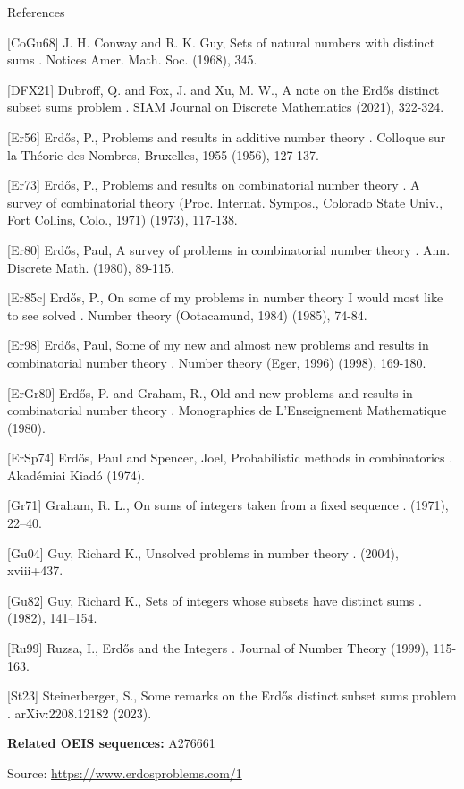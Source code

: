 \documentclass{article}
\begin{document}
References

[CoGu68] J. H. Conway and R. K. Guy, Sets of natural numbers with distinct sums . Notices Amer. Math. Soc. (1968), 345.

[DFX21] Dubroff, Q. and Fox, J. and Xu, M. W., A note on the Erd\H{o}s distinct subset sums problem . SIAM Journal on Discrete Mathematics (2021), 322-324.

[Er56] Erd\H{o}s, P., Problems and results in additive number theory . Colloque sur la Th\'{e}orie des Nombres, Bruxelles, 1955 (1956), 127-137.

[Er73] Erd\H{o}s, P., Problems and results on combinatorial number theory . A survey of combinatorial theory (Proc. Internat. Sympos., Colorado State Univ., Fort Collins, Colo., 1971) (1973), 117-138.

[Er80] Erd\H{o}s, Paul, A survey of problems in combinatorial number theory . Ann. Discrete Math. (1980), 89-115.

[Er85c] Erd\H{o}s, P., On some of my problems in number theory I would most like to see solved . Number theory (Ootacamund, 1984) (1985), 74-84.

[Er98] Erd\H{o}s, Paul, Some of my new and almost new problems and results in combinatorial number theory . Number theory (Eger, 1996) (1998), 169-180.

[ErGr80] Erd\H{o}s, P. and Graham, R., Old and new problems and results in combinatorial number theory . Monographies de L'Enseignement Mathematique (1980).

[ErSp74] Erd\H{o}s, Paul and Spencer, Joel, Probabilistic methods in combinatorics . Akad\'{e}miai Kiad\'{o} (1974).

[Gr71] Graham, R. L., On sums of integers taken from a fixed sequence . (1971), 22--40.

[Gu04] Guy, Richard K., Unsolved problems in number theory . (2004), xviii+437.

[Gu82] Guy, Richard K., Sets of integers whose subsets have distinct sums . (1982), 141--154.

[Ru99] Ruzsa, I., Erd\H{o}s and the Integers . Journal of Number Theory (1999), 115-163.

[St23] Steinerberger, S., Some remarks on the Erd\H{o}s distinct subset sums problem . arXiv:2208.12182 (2023).

\noindent\textbf{Related OEIS sequences:} A276661


\bigskip
\noindent\small{Source: \url{https://www.erdosproblems.com/1}}
\end{document}
